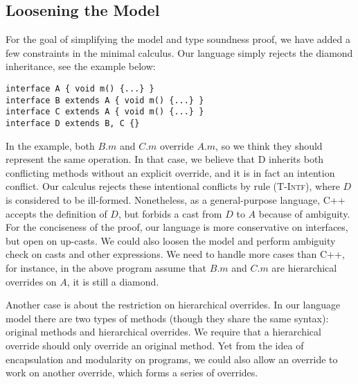 \subsection{Loosening the Model}

For the goal of simplifying the model and type soundness proof, we have added a few constraints in the minimal calculus. Our language simply rejects the diamond inheritance, see the example below:

\vspace{3pt}\begin{lstlisting}
interface A { void m() {...} }
interface B extends A { void m() {...} }
interface C extends A { void m() {...} }
interface D extends B, C {}
\end{lstlisting}\vspace{3pt}
In the example, both $B.m$ and $C.m$ override $A.m$, so we think they should represent the same operation. In that case, we believe that D inherits
both conflicting methods without an explicit override, and it is in fact an intention conflict. Our calculus rejects these intentional conflicts by rule \textsc{(T-Intf)}, where $D$ is considered to be ill-formed. Nonetheless, as a general-purpose language, C++ accepts the definition of $D$, but forbids a cast from $D$ to $A$ because of ambiguity. For the conciseness of the proof, our language is more conservative on interfaces, but open on up-casts. We could also loosen the model and perform ambiguity check on casts and other expressions. We need to handle more cases than C++, for instance, in the above program assume that $B.m$ and $C.m$ are hierarchical overrides on $A$, it is still a diamond.

Another case is about the restriction on hierarchical overrides. In our language model there are two types of methods (though they share the same syntax): original methods and hierarchical overrides. We require that a hierarchical override should only override an original method. Yet from the idea of encapsulation and modularity on programs, we could also allow an override to work on another override, which forms a series of overrides.

